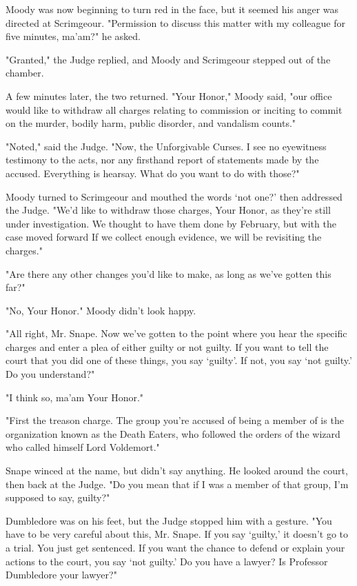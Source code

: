Moody was now beginning to turn red in the face, but it seemed his anger was directed at Scrimgeour. "Permission to discuss this matter with my colleague for five minutes, ma'am?" he asked.

"Granted," the Judge replied, and Moody and Scrimgeour stepped out of the chamber.

A few minutes later, the two returned. "Your Honor," Moody said, "our office would like to withdraw all charges relating to commission or inciting to commit on the murder, bodily harm, public disorder, and vandalism counts."

"Noted," said the Judge. "Now, the Unforgivable Curses. I see no eyewitness testimony to the acts, nor any firsthand report of statements made by the accused. Everything is hearsay. What do you want to do with those?"

Moody turned to Scrimgeour and mouthed the words `not one?' then addressed the Judge. "We'd like to withdraw those charges, Your Honor, as they're still under investigation. We thought to have them done by February, but with the case moved forward{\el} If we collect enough evidence, we will be revisiting the charges."

"Are there any other changes you'd like to make, as long as we've gotten this far?"

"No, Your Honor." Moody didn't look happy.

"All right, Mr. Snape. Now we've gotten to the point where you hear the specific charges and enter a plea of either guilty or not guilty. If you want to tell the court that you did one of these things, you say `guilty'. If not, you say `not guilty.' Do you understand?"

"I think so, ma'am{\el} Your Honor."

"First the treason charge. The group you're accused of being a member of is the organization known as the Death Eaters, who followed the orders of the wizard who called himself Lord Voldemort."

Snape winced at the name, but didn't say anything. He looked around the court, then back at the Judge. "Do you mean that if I was a member of that{\el} group, I'm supposed to say, guilty?"

Dumbledore was on his feet, but the Judge stopped him with a gesture. "You have to be very careful about this, Mr. Snape. If you say `guilty,' it doesn't go to a trial. You just get sentenced. If you want the chance to defend or explain your actions to the court, you say `not guilty.' Do you have a lawyer? Is Professor Dumbledore your lawyer?"

